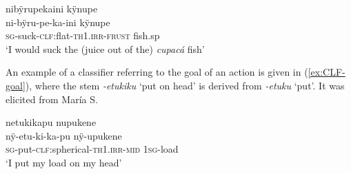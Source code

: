 \ea\label{ex:CLF-OBJ}
\begingl
\glpreamble nibÿrupekaini kÿnupe\\
\gla ni-bÿru-pe-ka-ini kÿnupe\\
\textsc{sg}-suck-\textsc{clf:}flat-\textsc{th}1\textsc{.irr}-\textsc{frust} fish.sp\\
\glft ‘I would suck the (juice out of the) \textit{cupacá} fish’
\endgl
{}
\xe

An example of a classifier referring to the goal of an action is given in (\ref{ex:CLF-goal}), where the stem \textit{-etukiku} ‘put on head’ is derived from \textit{-etuku} ‘put’. It was elicited from María S.

\ea\label{ex:CLF-goal}
\begingl
\glpreamble netukikapu nupukene\\
\gla nÿ-etu-ki-ka-pu nÿ-upukene\\
\textsc{sg}-put-\textsc{clf:}spherical-\textsc{th}1\textsc{.irr}-\textsc{mid} 1\textsc{sg}-load\\
\glft ‘I put my load on my head’
\endgl
\trailingcitation{[rxx-e181020le]}%
\xe




